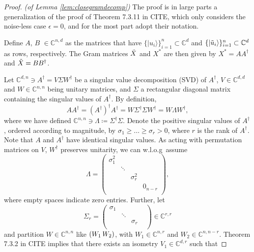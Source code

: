 \begin{proof}\emph{(of Lemma \ref{lem:closegramdecomp})}\hfill\break
The proof is in large parts a generalization of the proof of Theorem 7.3.11 in CITE, which only considers the noise-less case $\epsilon=0$, and for the most part adopt their notation. 

Define $A$, $B$ $\in\mathbb{C}^{n,d}$ as the matrices that have $\{\vert u_i\rangle\}_{i=1}^n\subset\mathbb{C}^{d}$ and $\{\vert \Tilde{u}_i \rangle\}_{i=1}^n\subset\mathbb{C}^{d}$ as rows, respectively. The Gram matrices $\Tilde{X}$ and $X^*$ are then given by $X^*=AA^{\dag}$ and $\Tilde{X}=BB^{\dag}$. 

Let $\mathbb{C}^{d,n}\ni A^\dag = V\Sigma W^\dag$ be a singular value decomposition (SVD) of $A^\dag$, $V\in\mathbb{C}^{d,d}$ and $W\in\mathbb{C}^{n,n}$ being unitary matrices, and $\Sigma$ a rectangular diagonal matrix containing the singular values of $A^\dag$. By definition, 
\begin{equation*}
AA^\dag=(A^\dag)^{\dag} A^{\dag} = W\Sigma^\dag\Sigma W^\dag = W\Lambda W^\dag,
\end{equation*} where we have defined $\mathbb{C}^{n,n}\ni\Lambda\coloneqq\Sigma^\dag\Sigma$. Denote the positive singular values of $A^\dag$, ordered according to magnitude, by $\sigma_1 \geq \dots \geq \sigma_r > 0$, where $r$ is the rank of $A^\dag$. Note that $A$ and $A^{\dag}$ have identical singular values. As acting with permutation matrices on $V$, $W^{\dag}$ preserves unitarity, we can w.l.o.g\ assume
\begin{equation*}
\Lambda = 
\begin{pmatrix}
\sigma_1^2 & & & \\
& \ddots & & \\
& & \sigma_r^2 & \\
& & & 0_{n-r}\\
\end{pmatrix},
\end{equation*}
where empty spaces indicate zero entries.
Further, let
\begin{equation*}
\Sigma_r = 
\begin{pmatrix}
\sigma_1 & &\\
& \ddots & & \\
& & \sigma_r\\
\end{pmatrix}\in\mathbb{C}^{r,r}
\end{equation*} and partition $W\in\mathbb{C}^{n,n}$ like $(W_1\thinspace W_2)$, with $W_1\in\mathbb{C}^{n,r}$ and $W_2\in\mathbb{C}^{n,n-r}$. Theorem 7.3.2 in CITE implies that there exists an isometry $V_1\in\mathbb{C}^{d,r}$ such that 

\end{proof}
